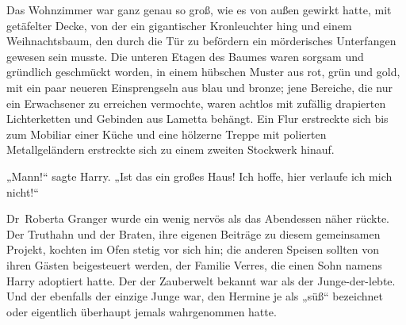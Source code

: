 Das Wohnzimmer war ganz genau so groß, wie es von außen gewirkt hatte, mit getäfelter Decke, von der ein gigantischer Kronleuchter hing und einem Weihnachtsbaum, den durch die Tür zu befördern ein mörderisches Unterfangen gewesen sein musste. Die unteren Etagen des Baumes waren sorgsam und gründlich geschmückt worden, in einem hübschen Muster aus rot, grün und gold, mit ein paar neueren Einsprengseln aus blau und bronze; jene Bereiche, die nur ein Erwachsener zu erreichen vermochte, waren achtlos mit zufällig drapierten Lichterketten und Gebinden aus Lametta behängt. Ein Flur erstreckte sich bis zum Mobiliar einer Küche und eine hölzerne Treppe mit polierten Metallgeländern erstreckte sich zu einem zweiten Stockwerk hinauf.

„Mann!“ sagte Harry. „Ist das ein großes Haus! Ich hoffe, hier verlaufe ich mich nicht!“

\later

Dr~Roberta Granger wurde ein wenig nervös als das Abendessen näher rückte. Der Truthahn und der Braten, ihre eigenen Beiträge zu diesem gemeinsamen Projekt, kochten im Ofen stetig vor sich hin; die anderen Speisen sollten von ihren Gästen beigesteuert werden, der Familie Verres, die einen Sohn namens Harry adoptiert hatte. Der der Zauberwelt bekannt war als der Junge-der-lebte. Und der ebenfalls der einzige Junge war, den Hermine je als „süß“ bezeichnet oder eigentlich überhaupt jemals wahrgenommen hatte.

